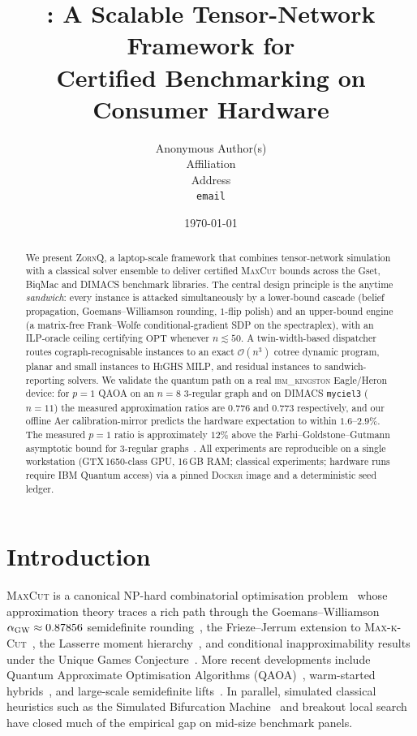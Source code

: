 \documentclass{article}
\title{\ZornQ: A Scalable Tensor-Network Framework for\\
       Certified \MaxCut Benchmarking on Consumer Hardware}
\author{%
  Anonymous Author(s) \\
  Affiliation \\
  Address \\
  \texttt{email}
}
\date{\today}
\theoremstyle{definition}
\theoremstyle{remark}
\newcommand{\MaxCut}{\textsc{MaxCut}\xspace}
\newcommand{\MaxkCut}[1]{\textsc{Max-#1-Cut}\xspace}
\newcommand{\ZornQ}{\textsc{ZornQ}\xspace}
\newcommand{\QAOA}{\textsc{QAOA}\xspace}
\newcommand{\ILP}{\textsc{ILP}\xspace}
\newcommand{\SDP}{\textsc{SDP}\xspace}
\newcommand{\MILP}{\textsc{MILP}\xspace}
\newcommand{\GW}{\textsc{GW}\xspace}
\newcommand{\OPT}{\mathrm{OPT}}
\newcommand{\Oh}{\mathcal{O}}
\begin{document}
\maketitle

\begin{abstract}
We present \ZornQ, a laptop-scale framework that combines tensor-network
simulation with a classical solver ensemble to deliver certified \MaxCut
bounds across the Gset, BiqMac and DIMACS benchmark libraries. The central
design principle is the anytime \emph{sandwich}: every instance is attacked
simultaneously by a lower-bound cascade (belief propagation,
Goemans--Williamson rounding, $1$-flip polish) and an upper-bound engine
(a matrix-free Frank--Wolfe conditional-gradient \SDP on the spectraplex),
with an \ILP-oracle ceiling certifying $\OPT$ whenever
$n \lesssim 50$. A twin-width-based dispatcher routes cograph-recognisable
instances to an exact $\Oh(n^3)$ cotree dynamic program, planar and small
instances to \textsc{HiGHS} \MILP, and residual instances to
sandwich-reporting solvers. We validate the quantum path on a real
\textsc{ibm\_kingston} Eagle/Heron device: for $p{=}1$ \QAOA on an
$n{=}8$ 3-regular graph and on DIMACS \texttt{myciel3} ($n{=}11$) the
measured approximation ratios are $0.776$ and $0.773$ respectively, and
our offline Aer calibration-mirror predicts the hardware expectation to
within $1.6$--$2.9\%$. The measured $p{=}1$ ratio is
approximately $12\%$ above the Farhi--Goldstone--Gutmann asymptotic bound
for $3$-regular graphs~\cite{farhi2014quantum}. All experiments are
reproducible on a single workstation (GTX\,1650-class GPU, 16\,GB RAM;
classical experiments; hardware runs require IBM Quantum access)
via a pinned \textsc{Docker} image and a deterministic seed ledger.
\end{abstract}

\section{Introduction}
\label{sec:introduction}

\MaxCut is a canonical NP-hard combinatorial optimisation
problem~\cite{barahona1982computational} whose approximation theory
traces a rich path through the Goemans--Williamson $\alpha_{\GW}
\approx 0.87856$ semidefinite rounding~\cite{goemans1995improved}, the
Frieze--Jerrum extension to \MaxkCut{k}~\cite{frieze1997improved}, the
Lasserre moment hierarchy~\cite{lasserre2001global}, and conditional
inapproximability results under the Unique Games
Conjecture~\cite{khot2007optimal}. More recent developments include
Quantum Approximate Optimisation
Algorithms (\QAOA)~\cite{farhi2014quantum,hadfield2019quantum},
warm-started hybrids~\cite{egger2021warm}, and large-scale
semidefinite lifts~\cite{rendl2010solving,yurtsever2021scalable}. In
parallel, simulated classical heuristics such as the Simulated Bifurcation
Machine~\cite{goto2019combinatorial} and breakout local
search~\cite{benlic2013breakout} have closed much of the empirical gap
on mid-size benchmark panels.
\end{document}
